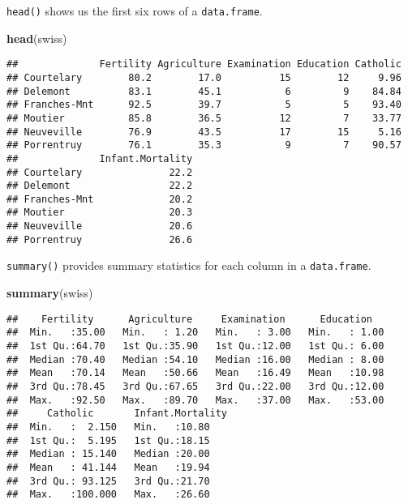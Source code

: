 \documentclass[]{book}
\newenvironment{Shaded}{\begin{snugshade}}{\end{snugshade}}
\newcommand{\KeywordTok}[1]{\textcolor[rgb]{0.13,0.29,0.53}{\textbf{{#1}}}}
\newcommand{\NormalTok}[1]{{#1}}
\theoremstyle{definition}
\theoremstyle{definition}
\theoremstyle{remark}
\begin{document}
\texttt{head()} shows us the first six rows of a \texttt{data.frame}.

\begin{Shaded}
\begin{Highlighting}[]
\KeywordTok{head}\NormalTok{(swiss)}
\end{Highlighting}
\end{Shaded}

\begin{verbatim}
##              Fertility Agriculture Examination Education Catholic
## Courtelary        80.2        17.0          15        12     9.96
## Delemont          83.1        45.1           6         9    84.84
## Franches-Mnt      92.5        39.7           5         5    93.40
## Moutier           85.8        36.5          12         7    33.77
## Neuveville        76.9        43.5          17        15     5.16
## Porrentruy        76.1        35.3           9         7    90.57
##              Infant.Mortality
## Courtelary               22.2
## Delemont                 22.2
## Franches-Mnt             20.2
## Moutier                  20.3
## Neuveville               20.6
## Porrentruy               26.6
\end{verbatim}

\texttt{summary()} provides summary statistics for each column in a
\texttt{data.frame}.

\begin{Shaded}
\begin{Highlighting}[]
\KeywordTok{summary}\NormalTok{(swiss)}
\end{Highlighting}
\end{Shaded}

\begin{verbatim}
##    Fertility      Agriculture     Examination      Education    
##  Min.   :35.00   Min.   : 1.20   Min.   : 3.00   Min.   : 1.00  
##  1st Qu.:64.70   1st Qu.:35.90   1st Qu.:12.00   1st Qu.: 6.00  
##  Median :70.40   Median :54.10   Median :16.00   Median : 8.00  
##  Mean   :70.14   Mean   :50.66   Mean   :16.49   Mean   :10.98  
##  3rd Qu.:78.45   3rd Qu.:67.65   3rd Qu.:22.00   3rd Qu.:12.00  
##  Max.   :92.50   Max.   :89.70   Max.   :37.00   Max.   :53.00  
##     Catholic       Infant.Mortality
##  Min.   :  2.150   Min.   :10.80   
##  1st Qu.:  5.195   1st Qu.:18.15   
##  Median : 15.140   Median :20.00   
##  Mean   : 41.144   Mean   :19.94   
##  3rd Qu.: 93.125   3rd Qu.:21.70   
##  Max.   :100.000   Max.   :26.60
\end{verbatim}
\end{document}
